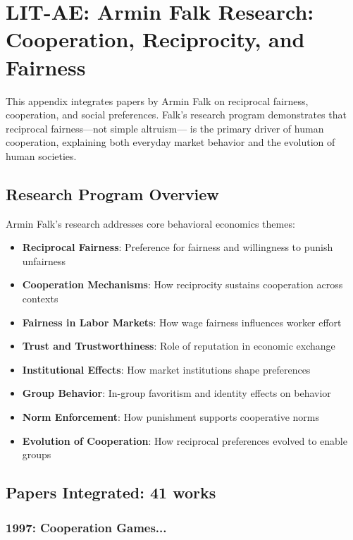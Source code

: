 \section{LIT-AE: Armin Falk Research: Cooperation, Reciprocity, and Fairness}
\label{app:litae}

This appendix integrates papers by Armin Falk on reciprocal fairness, cooperation, and social
preferences. Falk's research program demonstrates that reciprocal fairness—not simple altruism—
is the primary driver of human cooperation, explaining both everyday market behavior and the
evolution of human societies.

\subsection{Research Program Overview}

Armin Falk's research addresses core behavioral economics themes:

\begin{itemize}
  \item \textbf{Reciprocal Fairness}: Preference for fairness and willingness to punish unfairness
  \item \textbf{Cooperation Mechanisms}: How reciprocity sustains cooperation across contexts
  \item \textbf{Fairness in Labor Markets}: How wage fairness influences worker effort
  \item \textbf{Trust and Trustworthiness}: Role of reputation in economic exchange
  \item \textbf{Institutional Effects}: How market institutions shape preferences
  \item \textbf{Group Behavior}: In-group favoritism and identity effects on behavior
  \item \textbf{Norm Enforcement}: How punishment supports cooperative norms
  \item \textbf{Evolution of Cooperation}: How reciprocal preferences evolved to enable groups
\end{itemize}

\subsection{Papers Integrated: 41 works}


\subsubsection{1997: Cooperation Games...}

